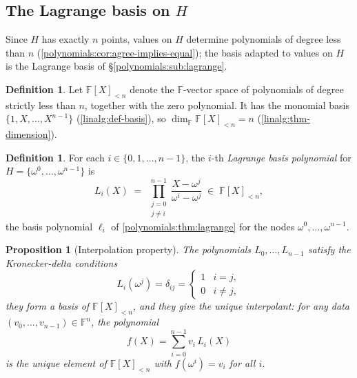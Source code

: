 \documentclass[11pt,a4paper]{article}
\newtheorem{proposition}[theorem]{Proposition}
\theoremstyle{definition}
\newtheorem{definition}[theorem]{Definition}
\theoremstyle{remark}
\newcommand{\F}{\ensuremath{\mathbb{F}}}
\begin{document}
\subsection{The Lagrange basis on \texorpdfstring{\(H\)}{H}}
\label{rootsofunity:sub-lagrange}

Since \(H\) has exactly \(n\) points, values on \(H\) determine
polynomials of degree less than \(n\)
(\cref{polynomials:cor:agree-implies-equal}); the basis adapted to values
on \(H\) is the Lagrange basis of \S\ref{polynomials:sub:lagrange}.

\begin{definition}\label{rootsofunity:def-poly}
Let \(\F[X]_{<n}\) denote the \(\F\)-vector space of polynomials of
degree strictly less than \(n\), together with the zero polynomial. It
has the monomial basis \(\{1, X, \dots, X^{n-1}\}\)
(\cref{linalg:def-basis}), so \(\dim_{\F} \F[X]_{<n} = n\)
(\cref{linalg:thm-dimension}).
\end{definition}

\begin{definition}\label{rootsofunity:def-lagrange}
For each \(i \in \{0, 1, \dots, n-1\}\), the \(i\)-th \emph{Lagrange
basis polynomial} for \(H = \{\omega^0, \dots, \omega^{n-1}\}\) is
\[
L_i(X) \;=\;
\prod_{\substack{j=0\\ j \ne i}}^{n-1}
\frac{X - \omega^j}{\omega^i - \omega^j}
\;\in\; \F[X]_{<n},
\]
the basis polynomial \(\ell_i\) of \cref{polynomials:thm:lagrange} for
the nodes \(\omega^0, \dots, \omega^{n-1}\).
\end{definition}

\begin{proposition}[Interpolation property]\label{rootsofunity:prp-lagrangeprop}
The polynomials \(L_0, \dots, L_{n-1}\) satisfy the Kronecker-delta
conditions
\[
L_i(\omega^j) = \delta_{ij} =
\begin{cases}
1 & i = j,\\
0 & i \ne j,
\end{cases}
\]
they form a basis of \(\F[X]_{<n}\), and they give the unique
interpolant: for any data \((v_0, \dots, v_{n-1}) \in \F^n\), the
polynomial
\[
f(X) = \sum_{i=0}^{n-1} v_i\, L_i(X)
\]
is the unique element of \(\F[X]_{<n}\) with \(f(\omega^i) = v_i\) for
all \(i\).
\end{proposition}
\end{document}
